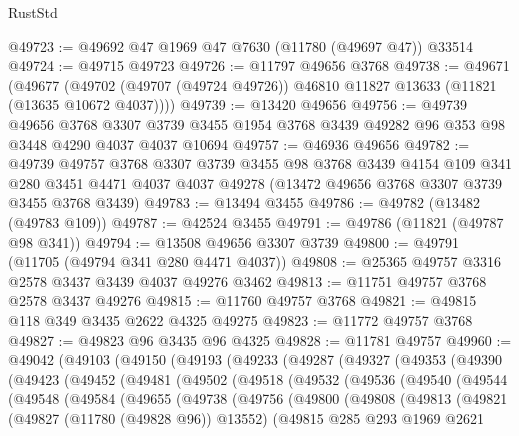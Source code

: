\begin{lexlean}{RustStd}
\begin{coremodule}
@49723 := @49692 @47 @1969 @47 @7630 (@11780 (@49697 @47)) @33514
@49724 := @49715 @49723
@49726 := @11797 @49656 @3768
@49738 := @49671
    (@49677 (@49702 (@49707 (@49724 @49726)) @46810 @11827 @13633 (@11821 (@13635 @10672 @4037))))
@49739 := @13420 @49656
@49756 := @49739
    @49656
    @3768
    @3307
    @3739
    @3455
    @1954
    @3768
    @3439
    @49282
    @96
    @353
    @98
    @3448
    @4290
    @4037
    @4037
    @10694
@49757 := @46936 @49656
@49782 := @49739
    @49757
    @3768
    @3307
    @3739
    @3455
    @98
    @3768
    @3439
    @4154
    @109
    @341
    @280
    @3451
    @4471
    @4037
    @4037
    @49278
    (@13472 @49656 @3768 @3307 @3739 @3455 @3768 @3439)
@49783 := @13494 @3455
@49786 := @49782 (@13482 (@49783 @109))
@49787 := @42524 @3455
@49791 := @49786 (@11821 (@49787 @98 @341))
@49794 := @13508 @49656 @3307 @3739
@49800 := @49791 (@11705 (@49794 @341 @280 @4471 @4037))
@49808 := @25365 @49757 @3316 @2578 @3437 @3439 @4037 @49276 @3462
@49813 := @11751 @49757 @3768 @2578 @3437 @49276
@49815 := @11760 @49757 @3768
@49821 := @49815 @118 @349 @3435 @2622 @4325 @49275
@49823 := @11772 @49757 @3768
@49827 := @49823 @96 @3435 @96 @4325
@49828 := @11781 @49757
@49960 := @49042
    (@49103
      (@49150
        (@49193
          (@49233
            (@49287
              (@49327
                (@49353
                  (@49390
                    (@49423
                      (@49452
                        (@49481
                          (@49502
                            (@49518
                              (@49532
                                (@49536
                                  (@49540
                                    (@49544
                                      (@49548
                                        (@49584
                                          (@49655
                                            (@49738
                                              (@49756
                                                (@49800
                                                  (@49808
                                                    (@49813
                                                      (@49821
                                                        (@49827 (@11780 (@49828 @96)) @13552)
                                                        (@49815
                                                          @285
                                                          @293
                                                          @1969
                                                          @2621

\end{coremodule}
\end{lexlean}
